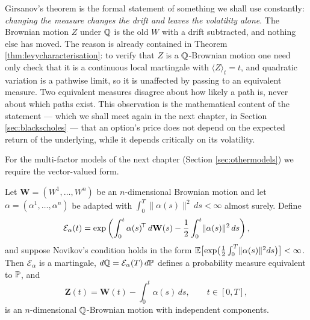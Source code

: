 Girsanov's theorem is the formal statement of something we shall use constantly: \emph{changing the 
measure changes the drift and leaves the volatility alone}. The Brownian motion $Z$ under 
$\mathbb{Q}$ is the old $W$ with a drift subtracted, and nothing else has moved. The reason is 
already contained in Theorem \ref{thm:levycharacterisation}: to verify that $Z$ is a $\mathbb{Q}$-Brownian 
motion one need only check that it is a continuous local martingale with $\langle Z\rangle_t = t$, 
and quadratic variation is a pathwise limit, so it is unaffected by passing to an equivalent 
measure. Two equivalent measures disagree about how likely a path is, never about which paths 
exist. This observation is the mathematical content of the statement --- which we shall meet again 
in the next chapter, in Section \ref{sec:blackscholes} --- that an option's price does not depend on the expected return 
of the underlying, while it depends critically on its volatility.

For the multi-factor models of the next chapter (Section \ref{sec:othermodels}) we require the vector-valued form.

\begin{theorem}\label{thm:girsanovmulti}
Let $\mathbf{W} = (W^1,\dots,W^n)$ be an $n$-dimensional Brownian motion and let 
$\alpha = (\alpha^1,\dots,\alpha^n)$ be  adapted  with 
$\int_0^T \lVert\alpha(s)\rVert^2\,ds < \infty$ almost surely. Define
\begin{equation}
\mathcal{E}_\alpha(t) = \exp\left( \int_0^t \alpha(s)^{\!\top}\,d\mathbf{W}(s) - \frac{1}{2}\int_0^t \lVert \alpha(s)\rVert^2\,ds \right),
\end{equation}
and suppose Novikov's condition holds in the form 
$\mathbb{E}\bigl[\exp\bigl(\tfrac12\int_0^T \lVert\alpha(s)\rVert^2 ds\bigr)\bigr] < \infty$. Then 
$\mathcal{E}_\alpha$ is a martingale, $d\mathbb{Q} = \mathcal{E}_\alpha(T)\,d\mathbb{P}$ defines a 
probability measure equivalent to $\mathbb{P}$, and
\begin{equation}
\mathbf{Z}(t) = \mathbf{W}(t) - \int_0^t \alpha(s)\,ds, \qquad t \in [0,T],
\end{equation}
is an $n$-dimensional $\mathbb{Q}$-Brownian motion with independent components. \qedopentext
\end{theorem}


